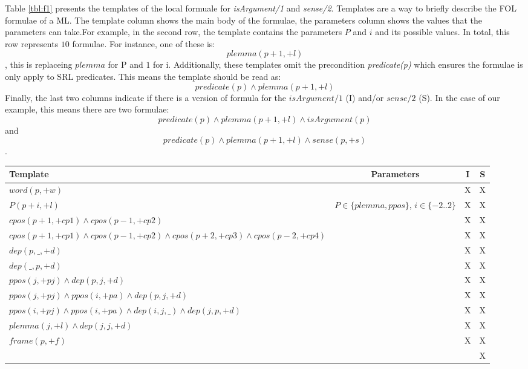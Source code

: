 Table \ref{tbl:f1} presents the templates of the local formuale for 
\emph{isArgument/1} and \emph{sense/2}. Templates are a way to briefly describe 
the FOL formulae of a ML. The template column shows the main body of the 
formulae, the parameters column shows the values that the parameters can take.For 
example, in the second row, the template contains the parameters $P$ and $i$ and its possible values. In total, this row represents $10$ 
formulae. For instance, one of these is: \[ plemma(p+1,+l) \], this is replaceing $plemma$ for P and $1$ for i. 
Additionally, these templates omit the precondition \emph{predicate(p)} which ensures the formulae is only apply to SRL predicates. This means the template should be read as: \[ predicate(p) \land  plemma(p+1,+l) \]
Finally, the last two columns indicate if there is a version of formula for the 
$isArgument/1$ (I) and/or $sense/2$ (S). In the case of our example, this means there are two formulae:
\[ predicate(p) \land plemma(p+1,+l) \land isArgument(p) \] and \[predicate(p) \land plemma(p+1,+l) \land sense(p,+s)\].

\begin{table*}
\centering
\begin{tabular}{|p{8cm}|c|c|c|}\hline
   Template       & Parameters & I & S \\\hline
   $ word(p,+w)$  &            & X & X \\
   $ P(p+i,+l)$   & $P \in \{plemma, ppos\}$, $ i \in \{-2..2\}$ & X & X \\
   $ cpos(p+1,+cp1) \land cpos(p-1,+cp2)$ & & X & X\\
   $ cpos(p+1,+cp1) \land cpos(p-1,+cp2) \land cpos(p+2,+cp3) \land cpos(p-2,+cp4)$ & & X & X\\
   $ dep(p,\_,+d)$ & & X & X\\
   $ dep(\_,p,+d)$ & & X & X\\
   $ ppos(j,+pj)  \land dep(p,j,+d)$ & & X & X \\
   $ ppos(j,+pj)  \land ppos(i,+pa) \land dep(p,j,+d)$ & & X & X \\
   $ ppos(i,+pj)  \land ppos(i,+pa) \land dep(i,j,\_) \land dep(j,p,+d)$ & & X & X \\
   $ plemma(j,+l) \land dep(j,j,+d)$ & & X & X\\
   $ frame(p,+f)$ & & X & X\\
                  & &   & X \\
\hline
\end{tabular}
\caption{Templates of the local formulae for \emph{isArgument/1} and 
\emph{sense/2}. I: head of clause is $isArgument(a)$, S: head of clause is 
$sense(p,+s)$}
\label{tbl:f1}
\end{table*}

